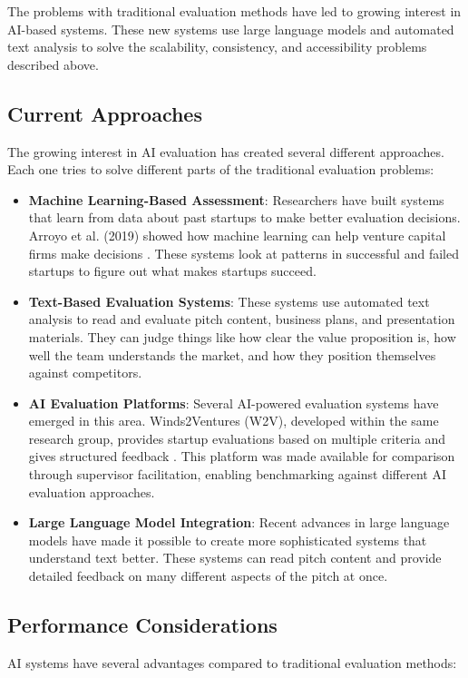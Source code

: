 The problems with traditional evaluation methods have led to growing interest in AI-based systems. These new systems use large language models and automated text analysis to solve the scalability, consistency, and accessibility problems described above.

\subsection{Current Approaches}\label{subsec:current-approaches}
The growing interest in AI evaluation has created several different approaches. Each one tries to solve different parts of the traditional evaluation problems:

\begin{itemize}
    \item \textbf{Machine Learning-Based Assessment}: Researchers have built systems that learn from data about past startups to make better evaluation decisions. Arroyo et al. (2019) showed how machine learning can help venture capital firms make decisions \cite{Arroyo2019}. These systems look at patterns in successful and failed startups to figure out what makes startups succeed.

    \item \textbf{Text-Based Evaluation Systems}: These systems use automated text analysis to read and evaluate pitch content, business plans, and presentation materials. They can judge things like how clear the value proposition is, how well the team understands the market, and how they position themselves against competitors.

    \item \textbf{AI Evaluation Platforms}: Several AI-powered evaluation systems have emerged in this area. Winds2Ventures (W2V), developed within the same research group, provides startup evaluations based on multiple criteria and gives structured feedback \cite{w2v}. This platform was made available for comparison through supervisor facilitation, enabling benchmarking against different AI evaluation approaches.

    \item \textbf{Large Language Model Integration}: Recent advances in large language models have made it possible to create more sophisticated systems that understand text better. These systems can read pitch content and provide detailed feedback on many different aspects of the pitch at once.
\end{itemize}

\subsection{Performance Considerations}\label{subsec:performance-considerations}
AI systems have several advantages compared to traditional evaluation methods:

